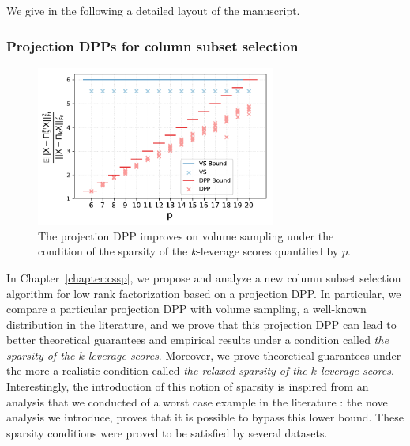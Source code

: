 \documentclass[twoside,11pt]{book}
\numberwithin{theorem}{chapter}
\numberwithin{definition}{chapter}
\numberwithin{proposition}{chapter}
\numberwithin{corollary}{chapter}
\numberwithin{example}{chapter}
\numberwithin{lemma}{chapter}
\numberwithin{assumption}{chapter}
\numberwithin{equation}{chapter}
\numberwithin{figure}{chapter}
\begin{document}


We give in the following a detailed layout of the manuscript.

\subsubsection{Projection DPPs for column subset selection}

\begin{figure}[h]
\centering
\includegraphics[width= 0.7\textwidth]{img/cssp/numexp/toydatasets/dpp_k_5_matrices_number_100_N_100_smooth_spectrum_flat_spectrum_after}
\caption{The projection DPP improves on volume sampling under the condition of the sparsity of the $k$-leverage scores quantified by $p$. \label{fig:intro_chapter_cssp_snapshot}}
\end{figure}

In Chapter~\ref{chapter:cssp}, we propose and analyze a new column subset selection algorithm for low rank factorization based on a projection DPP. 
In particular, we compare a particular projection DPP with volume sampling, a well-known distribution in the literature, and we prove that this projection DPP can lead to better theoretical guarantees and empirical results under a condition called \emph{the sparsity of the $k$-leverage scores}. Moreover, we prove theoretical guarantees under the more a realistic condition called \emph{the relaxed sparsity of the $k$-leverage scores}. Interestingly, the introduction of this notion of sparsity is inspired from an analysis that we conducted of a worst case example in the literature \citep{DeRa10}: the novel analysis we introduce, proves that it is possible to bypass this lower bound. These sparsity conditions were proved to be satisfied by several datasets. 
\end{document}
